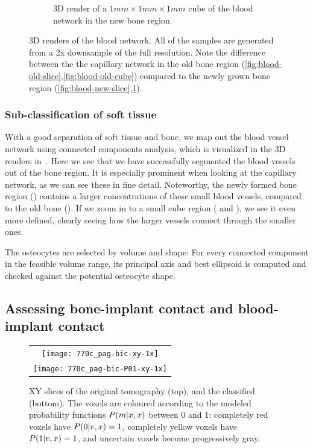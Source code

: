 \begin{figure}
\begin{subfigure}[b]{.45\linewidth}
        \caption{3D render of a $1mm \times 1 mm \times 1 mm$ cube of the blood network in the new bone region.}
        \label{fig:blood-new-cube}
    \end{subfigure}
    \caption{3D renders of the blood network. All of the samples are generated from a 2x downsample of the full resolution. Note the difference between the the capillary network in the old bone region (\ref{fig:blood-old-slice},\ref{fig:blood-old-cube}) compared to the newly grown bone region (\ref{fig:blood-new-slice},\ref{fig:blood-new-cube}).}
    \label{fig:blood-network}
\end{figure}

\subsubsection{Sub-classification of soft tissue}

With a good separation of soft tissue and bone, we map out the blood vessel network using connected
components analysis, which is visualized in the 3D renders in~.
Here we see that we have successfully segmented the blood vessels out of the bone region.
It is especially prominent when looking at the capillary network, as we can see these in fine detail.
Noteworthy, the newly formed bone region () contains a larger concentrations of these small blood vessels, compared to the old bone ().
If we zoom in to a small cube region ( and ), we see it even more defined, clearly seeing how the larger vessels connect through the smaller ones.

The osteocytes are selected by volume and shape: For every connected component
in the feasible volume range, its principal axis and best ellipsoid is computed and checked against
the potential osteocyte shape.

\subsection{Assessing bone-implant contact and blood-implant contact}

\begin{figure}
  \centering
  \begin{tabular}{c}
    \texttt{[image: 770c\_pag-bic-xy-1x]} \\
    \texttt{[image: 770c\_pag-bic-P01-xy-1x]}
  \end{tabular}
  \caption{XY slices of the original tomography (top), and the classified (bottom). The voxels are coloured according to the modeled probability functions $P(m|x,x)$ between 0 and 1: completely red voxels have $P(0|v,x) = 1$, completely yellow voxels have $P(1|v,x) = 1$, and uncertain voxels become progressively gray.
  }
  \label{fig:histology-comparison1}
\end{figure}

